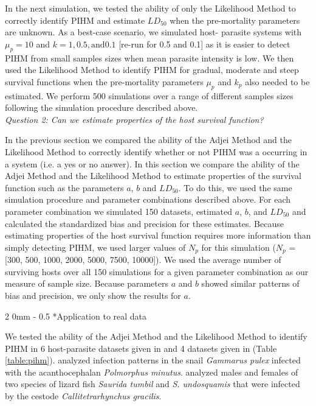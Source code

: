\documentclass[12pt, a4paper]{article}
\makeatletter
\renewcommand{\subsection}{\@startsection
{subsection}%
{2}%
{0mm}%
{-\baselineskip}%
{0.5\baselineskip}%
{\normalfont\bf}} %
\makeatother
\begin{document}
In the next simulation, we tested the ability of only the Likelihood Method to
correctly identify PIHM and estimate $LD_{50}$ when the pre-mortality
parameters are unknown.  As a best-case scenario, we simulated host-
parasite systems with $\mu_p = 10$ and $k = 1, 0.5, \text{and} 0.1$ [re-run for 0.5 and 0.1] as it is easier to detect PIHM from small samples sizes when mean parasite intensity is low. We then used
the Likelihood Method to identify PIHM for gradual, moderate and steep survival
functions when the pre-mortality parameters $\mu_p$ and $k_p$ also needed to be estimated.  We
perform 500 simulations over a range of different samples sizes following the
simulation procedure described above. \\

\noindent
\emph{Question 2: Can we estimate properties of the host survival function?}

In the previous section we compared the ability of the Adjei Method and the Likelihood Method to correctly identify whether or not PIHM was a occurring in a system (i.e. a yes or no answer). In this section we compare the ability of the Adjei Method and the Likelihood Method to estimate properties of the survival function such as the parameters $a$, $b$ and $LD_{50}$.  To do this, we used the same simulation procedure and parameter combinations described above. For each parameter
combination we simulated 150 datasets, estimated $a$, $b$, and $LD_{50}$ and calculated the standardized bias and
precision \citep{Walther2005} for these estimates.  Because estimating properties of the host survival function requires more information than simply detecting PIHM, we used larger values of $N_p$ for this simulation ($N_p$ = [300, 500, 1000, 2000, 5000, 7500,
10000]).  We used the average number of surviving hosts over all 150 simulations for a given parameter combination as our measure of sample size.  Because parameters $a$ and $b$ showed similar patterns of bias and precision, we only show the results for $a$.


\subsection*{Application to real data}

We tested the ability of the Adjei Method and the Likelihood Method to identify
PIHM in 6 host-parasite datasets given in \cite{Crofton1971a} and 4 datasets
given in \cite{Adjei1986} (Table \ref{table:pihm}). \citeauthor{Crofton1971a} analyzed infection patterns in the snail \emph{Gammarus pulex} infected with the
acanthocephalan \emph{Polmorphus minutus}. \citeauthor{Adjei1986} analyzed males and females of two species of lizard fish \emph{Saurida tumbil} and
\emph{S. undosquamis} that were infected by the cestode
\emph{Callitetrarhynchus gracilis}.
\end{document}
